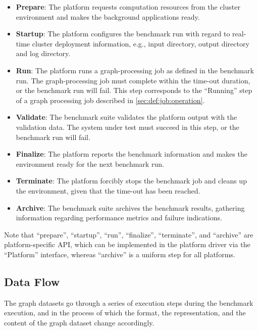 \begin{itemize}
    \item \textbf{Prepare}: The platform requests computation resources from the cluster environment and makes the background applications ready.
    
    \item \textbf{Startup}: The platform configures the benchmark run with regard to real-time cluster deployment information, e.g., input directory, output directory and log directory.
    
    \item \textbf{Run}: The platform runs a graph-processing job as defined in the benchmark run. The graph-processing job must complete within the time-out duration, or the benchmark run will fail. This step corresponds to the ``Running'' step of a graph processing job described in \ref{sec:def:job:operation}.
    
    \item \textbf{Validate}: The benchmark suite validates the platform output with the validation data. The system under test must succeed in this step, or the benchmark run will fail.
    
    \item \textbf{Finalize}: The platform reports the benchmark information and makes the environment ready for the next benchmark run.
    
    \item \textbf{Terminate}: The platform forcibly stops the benchmark job and cleans up the environment, given that the time-out has been reached. 
    
    \item \textbf{Archive}: The benchmark suite archives the benchmark results, gathering information regarding performance metrics and failure indications.
\end{itemize}

Note that ``prepare'', ``startup'', ``run'', ``finalize'', ``terminate'', and ``archive'' are platform-specific API, which can be implemented in the platform driver via the ``Platform'' interface, whereas ``archive'' is a uniform step for all platforms.  


\subsection{Data Flow}
\label{sec:process:execution:data_flow}
The graph datasets go through a series of execution steps during the benchmark execution, and in the process of which the format, the representation, and the content of the graph dataset change accordingly.

